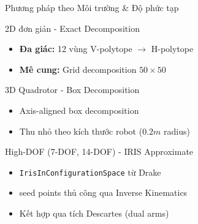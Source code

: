 \documentclass[aspectratio=169]{beamer}
\begin{document}
\begin{frame}{Phương pháp theo Môi trường \& Độ phức tạp}

    \begin{exampleblock}{2D đơn giản - Exact Decomposition}
        \begin{itemize}
            \item \textbf{Đa giác:} 12 vùng V-polytope $\rightarrow$ H-polytope
            \item \textbf{Mê cung:} Grid decomposition $50 \times 50$
        \end{itemize}
    \end{exampleblock}

    \begin{exampleblock}{3D Quadrotor - Box Decomposition}
        \begin{itemize}
            \item Axis-aligned box decomposition
            \item Thu nhỏ theo kích thước robot ($0.2m$ radius)
        \end{itemize}
    \end{exampleblock}

    \begin{alertblock}{High-DOF (7-DOF, 14-DOF) - IRIS Approximate}
        \begin{itemize}
            \item \texttt{IrisInConfigurationSpace} từ Drake
            \item seed points thủ công qua Inverse Kinematics
            \item Kết hợp qua tích Descartes (dual arms)
        \end{itemize}
    \end{alertblock}

\end{frame}
\end{document}
